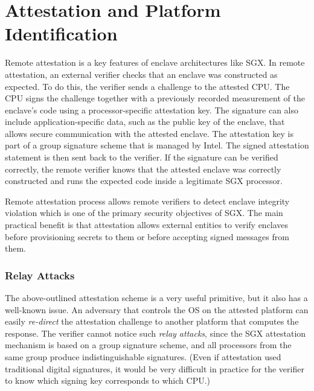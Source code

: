 
\section*{Attestation and Platform Identification}

Remote attestation is a key features of enclave architectures like SGX. In remote attestation, an external verifier checks that an enclave was constructed as expected. To do this, the verifier sends a challenge to the attested CPU. The CPU signs the challenge together with a previously recorded measurement of the enclave's code using a processor-specific attestation key. The signature can also include application-specific data, such as the public key of the enclave, that allows secure communication with the attested enclave. The attestation key is part of a group signature scheme that is managed by Intel. The signed attestation statement is then sent back to the verifier. If the signature can be verified correctly, the remote verifier knows that the attested enclave was correctly constructed and runs the expected code inside a legitimate SGX processor. 

Remote attestation process allows remote verifiers to detect enclave integrity violation which is one of the primary security objectives of SGX. The main practical benefit is that attestation allows external entities to verify enclaves before provisioning secrets to them or before accepting signed messages from them.  

\subsubsection*{Relay Attacks}

The above-outlined attestation scheme is a very useful primitive, but it also has a well-known issue. 
An adversary that controls the OS on the attested platform can easily \emph{re-direct} the attestation challenge to another platform that computes the response. 
The verifier cannot notice such \emph{relay attacks}, since the SGX attestation mechanism is based on a group signature scheme, and all processors from the same group produce indistinguishable signatures. (Even if attestation used traditional digital signatures, it would be very difficult in practice for the verifier to know which signing key corresponds to which CPU.) 

